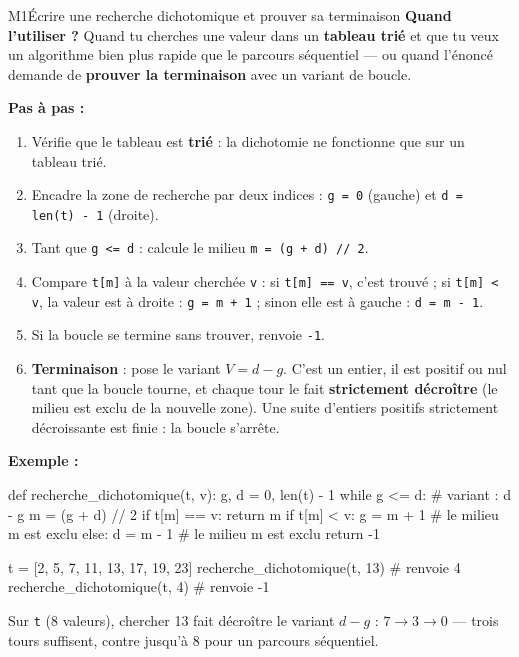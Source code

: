 \begin{fichemethode}{M1}{Écrire une recherche dichotomique et prouver sa terminaison}
\textbf{Quand l'utiliser ?} Quand tu cherches une valeur dans un \textbf{tableau trié} et que tu veux un algorithme bien plus rapide que le parcours séquentiel — ou quand l'énoncé demande de \textbf{prouver la terminaison} avec un variant de boucle.

\textbf{Pas à pas :}
\begin{enumerate}
  \item Vérifie que le tableau est \textbf{trié} : la dichotomie ne fonctionne que sur un tableau trié.
  \item Encadre la zone de recherche par deux indices : \lstinline{g = 0} (gauche) et \lstinline{d = len(t) - 1} (droite).
  \item Tant que \lstinline{g <= d} : calcule le milieu \lstinline{m = (g + d) // 2}.
  \item Compare \lstinline{t[m]} à la valeur cherchée \lstinline{v} :
    si \lstinline{t[m] == v}, c'est trouvé ; si \lstinline{t[m] < v}, la valeur est à droite : \lstinline{g = m + 1} ;
    sinon elle est à gauche : \lstinline{d = m - 1}.
  \item Si la boucle se termine sans trouver, renvoie \lstinline{-1}.
  \item \textbf{Terminaison} : pose le variant $V = d - g$. C'est un entier, il est
    positif ou nul tant que la boucle tourne, et chaque tour le fait
    \textbf{strictement décroître} (le milieu est exclu de la nouvelle zone).
    Une suite d'entiers positifs strictement décroissante est finie : la boucle s'arrête.
\end{enumerate}

\textbf{Exemple :}
\begin{python}
def recherche_dichotomique(t, v):
    g, d = 0, len(t) - 1
    while g <= d:            # variant : d - g
        m = (g + d) // 2
        if t[m] == v:
            return m
        if t[m] < v:
            g = m + 1        # le milieu m est exclu
        else:
            d = m - 1        # le milieu m est exclu
    return -1

t = [2, 5, 7, 11, 13, 17, 19, 23]
recherche_dichotomique(t, 13)   # renvoie 4
recherche_dichotomique(t, 4)    # renvoie -1
\end{python}
Sur \lstinline{t} (8 valeurs), chercher 13 fait décroître le variant $d-g$ :
$7 \to 3 \to 0$ — trois tours suffisent, contre jusqu'à 8 pour un parcours séquentiel.


\end{fichemethode}
